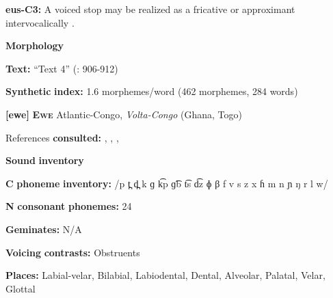 \begin{styleBody}
\textbf{eus-C3:} A voiced stop may be realized as a fricative or approximant intervocalically \citep[19]{Hualde2003}.
\end{styleBody}

\begin{styleBody}
\textbf{Morphology}
\end{styleBody}

\begin{styleBody}
\textbf{Text:} “Text 4” (\citealt{HualdeUrbina2003}: 906-912)
\end{styleBody}

\begin{styleBody}
\textbf{Synthetic} \textbf{index:} 1.6 morphemes/word (462 morphemes, 284 words)
\end{styleBody}

\begin{styleBody}
\textbf{[ewe]}   \textbf{\textsc{Ewe}}  Atlantic-Congo, \textit{Volta-Congo} (Ghana, Togo)
\end{styleBody}

\begin{styleBody}
References \textbf{consulted:} \citet{Ameka1991}, \citet{Duthie1996}, \citet{Jalloh2005}, \citet{Stahlke1971}
\end{styleBody}

\begin{styleBody}
\textbf{Sound} \textbf{inventory}
\end{styleBody}

\begin{styleBody}
\textbf{C} \textbf{phoneme} \textbf{inventory:} /p t̪ d̪ k ɡ k͡p ɡ͡b t͡s d͡z ɸ β f v s z x ɦ m n ɲ ŋ r l w/
\end{styleBody}

\begin{styleBody}
\textbf{N} \textbf{consonant} \textbf{phonemes:} 24
\end{styleBody}

\begin{styleBody}
\textbf{Geminates:} N/A
\end{styleBody}

\begin{styleBody}
\textbf{Voicing} \textbf{contrasts:} Obstruents
\end{styleBody}

\begin{styleBody}
\textbf{Places:} Labial-velar, Bilabial, Labiodental, Dental, Alveolar, Palatal, Velar, Glottal
\end{styleBody}

